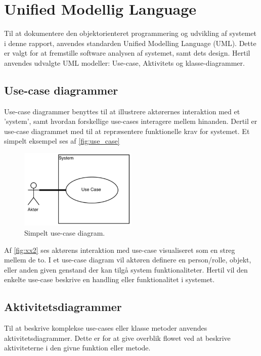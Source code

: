 \section{Unified Modellig Language}
Til at dokumentere den objektorienteret programmering og udvikling af systemet i denne rapport, anvendes standarden Unified Modelling Language (UML). Dette er valgt for at fremstille software analysen af systemet, samt dets design. Hertil anvendes udvalgte UML modeller: Use-case, Aktivitets og klasse-diagrammer. 

\subsection{Use-case diagrammer} 
Use-case diagrammer benyttes til at illustrere aktørernes interaktion med et 'system', samt hvordan forskellige use-cases interagere mellem hinanden. Dertil er use-case diagrammet med til at repræsentere funktionelle krav for systemet. Et simpelt eksempel ses af \autoref{fig:use_case} 

\begin{figure} [H]
\centering
\includegraphics[width=0.5\textwidth]{figures/USE_CASE2}
\caption{Simpelt use-case diagram.}
\label{fig:use_case}
\end{figure}

Af \autoref{fig:xx2} ses aktørens interaktion med use-case visualiseret som en streg mellem de to. I et use-case diagram vil aktøren definere en person/rolle, objekt, eller anden given genstand der kan tilgå system funktionaliteter. Hertil vil den enkelte use-case beskrive en handling eller funktionalitet i systemet. 


\subsection{Aktivitetsdiagrammer}
Til at beskrive komplekse use-cases eller klasse metoder anvendes aktivitetsdiagrammer. Dette er for at give overblik flowet ved at beskrive aktiviteterne i den givne funktion eller metode.     

